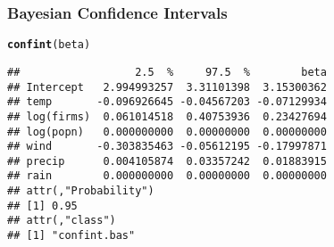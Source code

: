 \documentclass[handout]{beamer}\usepackage[]{graphicx}\usepackage[]{color}
\makeatletter
\newcommand{\hlstd}[1]{\textcolor[rgb]{0.345,0.345,0.345}{#1}}%
\newcommand{\hlkwd}[1]{\textcolor[rgb]{0.737,0.353,0.396}{\textbf{#1}}}%
\newenvironment{kframe}{%
 \def\at@end@of@kframe{}%
 \ifinner\ifhmode%
  \def\at@end@of@kframe{\end{minipage}}%
  \begin{minipage}{\columnwidth}%
 \fi\fi%
 \def\FrameCommand##1{\hskip\@totalleftmargin \hskip-\fboxsep
 \colorbox{shadecolor}{##1}\hskip-\fboxsep
     \hskip-\linewidth \hskip-\@totalleftmargin \hskip\columnwidth}%
 \MakeFramed {\advance\hsize-\width
   \@totalleftmargin\z@ \linewidth\hsize
   \@setminipage}}%
 {\par\unskip\endMakeFramed%
 \at@end@of@kframe}
\newenvironment{knitrout}{}{} %
\makeatother
\begin{document}
\begin{frame}[fragile] \frametitle{Bayesian Confidence Intervals}
\begin{knitrout}
\color{fgcolor}\begin{kframe}
\begin{alltt}
\hlkwd{confint}\hlstd{(beta)}
\end{alltt}
\begin{verbatim}
##                  2.5  %     97.5  %        beta
## Intercept   2.994993257  3.31101398  3.15300362
## temp       -0.096926645 -0.04567203 -0.07129934
## log(firms)  0.061014518  0.40753936  0.23427694
## log(popn)   0.000000000  0.00000000  0.00000000
## wind       -0.303835463 -0.05612195 -0.17997871
## precip      0.004105874  0.03357242  0.01883915
## rain        0.000000000  0.00000000  0.00000000
## attr(,"Probability")
## [1] 0.95
## attr(,"class")
## [1] "confint.bas"
\end{verbatim}
\end{kframe}
\end{knitrout}
\end{frame}
\end{document}
